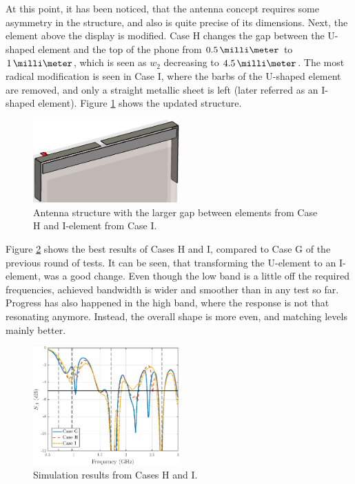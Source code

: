 At this point, it has been noticed, that the antenna concept requires some asymmetry in the structure, and also is quite precise of its dimensions. Next, the element above the display is modified. Case H changes the gap between the U-shaped element and the top of the phone from $0.5\,\milli\meter$ to $1\,\milli\meter$, which is seen as $w_2$ decreasing to $4.5\,\milli\meter$. The most radical modification is seen in Case I, where the barbs of the U-shaped element are removed, and only a straight metallic sheet is left (later referred as an I-shaped element). Figure \ref{fig:concept_i_shape} shows the updated structure.
\begin{figure}[H]
    \centering
    \includegraphics[width=0.5\textwidth]{img/concept_i_shape.eps}
    \caption{Antenna structure with the larger gap between elements from Case H and I-element from Case I.}
    \label{fig:concept_i_shape}
\end{figure}

Figure \ref{fig:concept4} shows the best results of Cases H and I, compared to Case G of the previous round of tests. It can be seen, that transforming the U-element to an I-element, was a good change. Even though the low band is a little off the required frequencies, achieved bandwidth is wider and smoother than in any test so far. Progress has also happened in the high band, where the response is not that resonating anymore. Instead, the overall shape is more even, and matching levels mainly better.
\begin{figure}[H]
    \centering
    \includegraphics[width=0.5\textwidth]{img/concept4.eps}
    \caption{Simulation results from Cases H and I.}
    \label{fig:concept4}
\end{figure}


